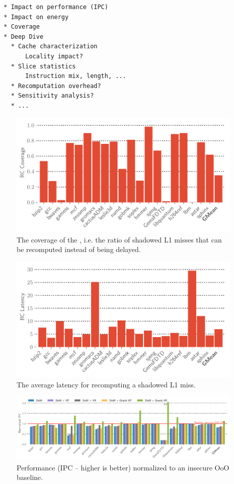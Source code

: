 \begin{verbatim}
  * Impact on performance (IPC)
  * Impact on energy
  * Coverage
  * Deep Dive
    * Cache characterization 
        Locality impact?
    * Slice statistics 
        Instruction mix, length, ...
    * Recomputation overhead?
    * Sensitivity analysis?
    * ...
 \end{verbatim}

\begin{figure}[t]
  \includegraphics[width=\columnwidth]{figs/rc_coverage.pdf}
  \caption{The coverage of the \recomp, i.e. the ratio of shadowed L1 misses that can be recomputed instead of being delayed.}
  \label{fig:rc-coverage}
\end{figure}

\begin{figure}[t]
  \includegraphics[width=\columnwidth]{figs/rc_latency.pdf}
  \caption{The average latency for recomputing a shadowed L1 miss.}
  \label{fig:rc-latency}
\end{figure}

\begin{figure}[t]
  \includegraphics[width=\textwidth]{figs/normalized_ipc_cut_all.pdf}
  \caption{Performance (IPC -- higher is better) normalized to an insecure OoO baseline.}
  \label{fig:ipc}
\end{figure}

